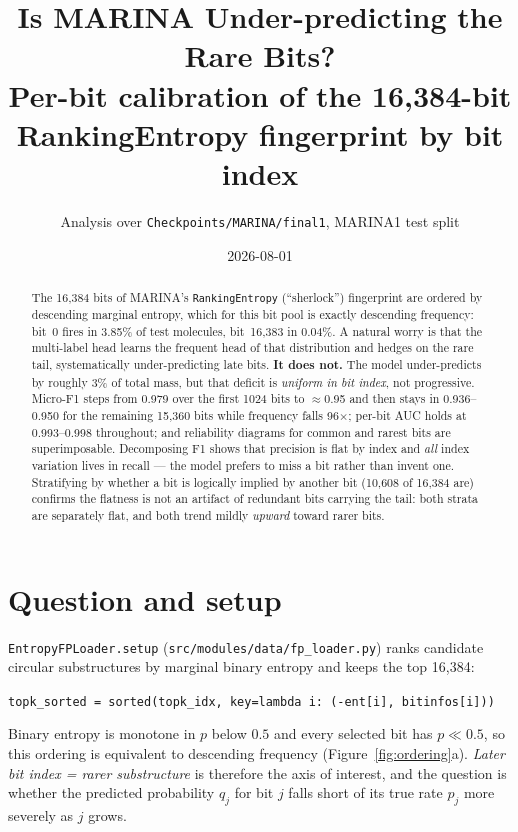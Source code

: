 \documentclass[11pt,a4paper]{article}
\title{\textbf{Is MARINA Under-predicting the Rare Bits?}\\[0.3em]
\large Per-bit calibration of the 16{,}384-bit RankingEntropy fingerprint by bit index}
\author{Analysis over \texttt{Checkpoints/MARINA/final1}, MARINA1 test split}
\date{2026-08-01}
\begin{document}
\maketitle

\begin{abstract}
\noindent
The 16{,}384 bits of MARINA's \texttt{RankingEntropy} (``sherlock'') fingerprint are ordered by
descending marginal entropy, which for this bit pool is exactly descending frequency: bit~0 fires in
3.85\% of test molecules, bit~16{,}383 in 0.04\%. A natural worry is that the multi-label head
learns the frequent head of that distribution and hedges on the rare tail, systematically
under-predicting late bits. \textbf{It does not.} The model under-predicts by roughly 3\% of total
mass, but that deficit is \emph{uniform in bit index}, not progressive. Micro-F1 steps from 0.979
over the first 1024 bits to $\approx$0.95 and then stays in 0.936--0.950 for the remaining 15{,}360
bits while frequency falls 96$\times$; per-bit AUC holds at 0.993--0.998 throughout; and reliability
diagrams for common and rarest bits are superimposable. Decomposing F1 shows that precision is
flat by index and \emph{all} index variation lives in recall --- the model prefers to miss a bit
rather than invent one. Stratifying by whether a bit is logically implied by another bit
(10{,}608 of 16{,}384 are) confirms the flatness is not an artifact of redundant bits carrying
the tail: both strata are separately flat, and both trend mildly \emph{upward} toward rarer bits.
\end{abstract}

\section{Question and setup}

\texttt{EntropyFPLoader.setup} (\texttt{src/modules/data/fp\_loader.py}) ranks candidate circular
substructures by marginal binary entropy and keeps the top 16{,}384:
\begin{center}
\texttt{topk\_sorted = sorted(topk\_idx, key=lambda i: (-ent[i], bitinfos[i]))}
\end{center}
Binary entropy is monotone in $p$ below $0.5$ and every selected bit has $p \ll 0.5$, so this
ordering is equivalent to descending frequency (Figure~\ref{fig:ordering}a). \emph{Later bit index
= rarer substructure} is therefore the axis of interest, and the question is whether the predicted
probability $q_j$ for bit $j$ falls short of its true rate $p_j$ more severely as $j$ grows.
\end{document}
